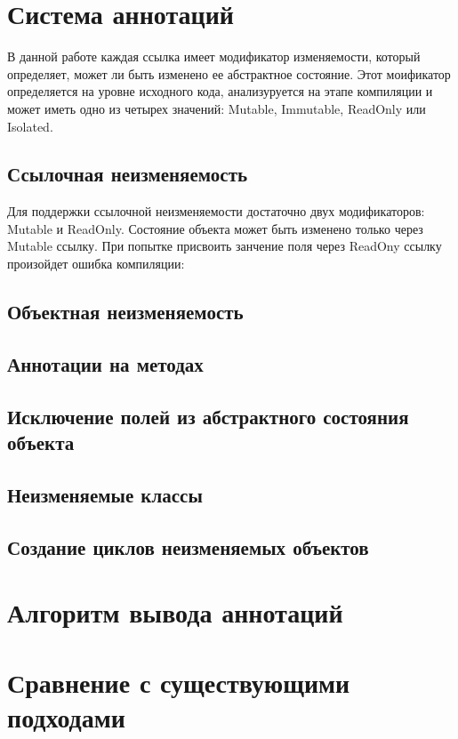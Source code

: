 \section{Система аннотаций}

В данной работе каждая ссылка имеет модификатор изменяемости, который определяет, может ли быть изменено ее абстрактное состояние. Этот моификатор определяется на уровне исходного кода, анализуруется на этапе компиляции и может иметь одно из четырех значений: Mutable, Immutable, ReadOnly или Isolated. 

\subsection{Ссылочная неизменяемость}

Для поддержки ссылочной неизменяемости достаточно двух модификаторов: Mutable и ReadOnly. Состояние объекта может быть изменено только через Mutable ссылку. При попытке присвоить занчение поля через ReadOny ссылку произойдет ошибка компиляции:

\subsection{Объектная неизменяемость}

\subsection{Аннотации на методах}

\subsection{Исключение полей из абстрактного состояния объекта}

\subsection{Неизменяемые классы}

\subsection{Создание циклов неизменяемых объектов}




\section{Алгоритм вывода аннотаций}

\section{Сравнение с существующими подходами}


